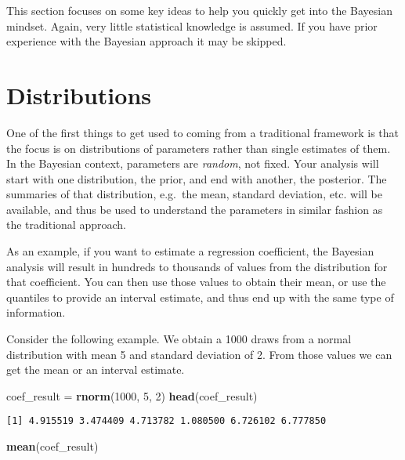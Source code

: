 \documentclass[]{book}
\newenvironment{Shaded}{\begin{snugshade}}{\end{snugshade}}
\newcommand{\KeywordTok}[1]{\textcolor[rgb]{0.13,0.29,0.53}{\textbf{{#1}}}}
\newcommand{\DecValTok}[1]{\textcolor[rgb]{0.00,0.00,0.81}{{#1}}}
\newcommand{\StringTok}[1]{\textcolor[rgb]{0.31,0.60,0.02}{{#1}}}
\newcommand{\NormalTok}[1]{{#1}}
\begin{document}
This section focuses on some key ideas to help you quickly get into the
Bayesian mindset. Again, very little statistical knowledge is assumed.
If you have prior experience with the Bayesian approach it may be
skipped.

\section{Distributions}\label{distributions}

One of the first things to get used to coming from a traditional
framework is that the focus is on distributions of parameters rather
than single estimates of them. In the Bayesian context, parameters are
{\emph{random}}, not fixed. Your analysis will start with one
distribution, the {prior}, and end with another, the {posterior}. The
summaries of that distribution, e.g.~the mean, standard deviation, etc.
will be available, and thus be used to understand the parameters in
similar fashion as the traditional approach.

As an example, if you want to estimate a regression coefficient, the
Bayesian analysis will result in hundreds to thousands of values from
the distribution for that coefficient. You can then use those values to
obtain their mean, or use the quantiles to provide an interval estimate,
and thus end up with the same type of information.

Consider the following example. We obtain a 1000 draws from a normal
distribution with mean 5 and standard deviation of 2. From those values
we can get the mean or an interval estimate.

\begin{Shaded}
\begin{Highlighting}[]
\NormalTok{coef_result =}\StringTok{ }\KeywordTok{rnorm}\NormalTok{(}\DecValTok{1000}\NormalTok{, }\DecValTok{5}\NormalTok{, }\DecValTok{2}\NormalTok{)}
\KeywordTok{head}\NormalTok{(coef_result)}
\end{Highlighting}
\end{Shaded}

\begin{verbatim}
[1] 4.915519 3.474409 4.713782 1.080500 6.726102 6.777850
\end{verbatim}

\begin{Shaded}
\begin{Highlighting}[]
\KeywordTok{mean}\NormalTok{(coef_result)}
\end{Highlighting}
\end{Shaded}
\end{document}
